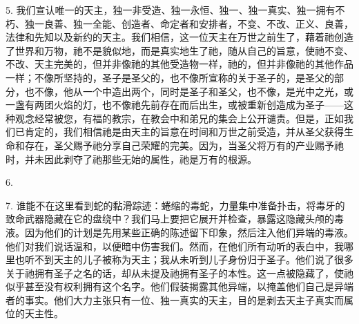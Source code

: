 5. 我们宣认唯一的天主，独一非受造、独一永恒、独一、独一真实、独一拥有不朽、独一良善、独一全能、创造者、命定者和安排者，不变、不改、正义、良善，法律和先知以及新约的天主。我们相信，这一位天主在万世之前生了，藉着祂创造了世界和万物，祂不是貌似地，而是真实地生了祂，随从自己的旨意，使祂不变、不改、天主完美的，但并非像祂的其他受造物一样，祂的，但并非像祂的其他作品一样；不像所坚持的，圣子是圣父的，也不像所宣称的关于圣子的，是圣父的部分，也不像，他从一个中造出两个，同时是圣子和圣父，也不像，是光中之光，或一盏有两团火焰的灯，也不像祂先前存在而后出生，或被重新创造成为圣子——这种观念经常被您，有福的教宗，在教会中和弟兄的集会上公开谴责。但是，正如我们已肯定的，我们相信祂是由天主的旨意在时间和万世之前受造，并从圣父获得生命和存在，圣父赐予祂分享自己荣耀的完美。因为，当圣父将万有的产业赐予祂时，并未因此剥夺了祂那些无始的属性，祂是万有的根源。\par

6. \par

7. 谁能不在这里看到蛇的黏滑踪迹：蜷缩的毒蛇，力量集中准备扑击，将毒牙的致命武器隐藏在它的盘绕中？我们马上要把它展开并检查，暴露这隐藏头颅的毒液。因为他们的计划是先用某些正确的陈述留下印象，然后注入他们异端的毒液。他们对我们说话温和，以便暗中伤害我们。然而，在他们所有动听的表白中，我哪里也听不到天主的儿子被称为天主；我从未听到儿子身份归于圣子。他们说了很多关于祂拥有圣子之名的话，却从未提及祂拥有圣子的本性。这一点被隐藏了，使祂似乎甚至没有权利拥有这个名字。他们假装揭露其他异端，以掩盖他们自己是异端者的事实。他们大力主张只有一位、独一真实的天主，目的是剥去天主子真实而属位的天主性。\par

